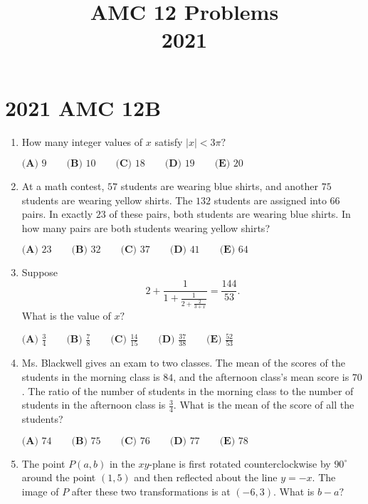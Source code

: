 \documentclass{article}
\title{AMC 12 Problems \\ 2021}
\date{}
\begin{document}
\maketitle\thispagestyle{fancy}\newpage\section*{2021 AMC 12B}
\begin{enumerate}[label=\arabic*., itemsep=0.5em]
\item How many integer values of \(x\) satisfy \(|x|<3\pi?\)

\(\textbf{(A) }9 \qquad \textbf{(B) }10 \qquad \textbf{(C) }18 \qquad \textbf{(D) }19 \qquad \textbf{(E) }20\)\par \vspace{0.5em}\item At a math contest, \(57\) students are wearing blue shirts, and another \(75\) students are wearing yellow shirts. The \(132\) students are assigned into \(66\) pairs. In exactly \(23\) of these pairs, both students are wearing blue shirts. In how many pairs are both students wearing yellow shirts?

\(\textbf{(A) }23 \qquad \textbf{(B) }32 \qquad \textbf{(C) }37 \qquad \textbf{(D) }41 \qquad \textbf{(E) }64\)\par \vspace{0.5em}\item Suppose
\begin{equation*}
2+\frac{1}{1+\frac{1}{2+\frac{2}{3+x}}}=\frac{144}{53}.
\end{equation*}
What is the value of \(x?\)

\(\textbf{(A) }\frac34 \qquad \textbf{(B) }\frac78 \qquad \textbf{(C) }\frac{14}{15} \qquad \textbf{(D) }\frac{37}{38} \qquad \textbf{(E) }\frac{52}{53}\)\par \vspace{0.5em}\item Ms. Blackwell gives an exam to two classes. The mean of the scores of the students in the morning class is \(84\), and the afternoon class's mean score is \(70\). The ratio of the number of students in the morning class to the number of students in the afternoon class is \(\frac34\). What is the mean of the score of all the students?

\(\textbf{(A) }74 \qquad \textbf{(B) }75 \qquad \textbf{(C) }76 \qquad \textbf{(D) }77 \qquad \textbf{(E) }78\)\par \vspace{0.5em}\item The point \(P(a,b)\) in the \(xy\)-plane is first rotated counterclockwise by \(90^\circ\) around the point \((1,5)\) and then reflected about the line \(y=-x\). The image of \(P\) after these two transformations is at \((-6,3)\). What is \(b-a?\)


\end{enumerate}
\end{document}
